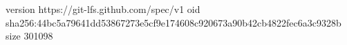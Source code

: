 version https://git-lfs.github.com/spec/v1
oid sha256:44bc5a79641dd53867273e5cf9e174608c920673a90b42cb4822fec6a3c9328b
size 301098
